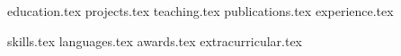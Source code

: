 \documentclass[letterpaper,11pt]{article}
\begin{document}


\vspace{-1cm}
{education.tex}
\vspace{-1.5cm}
{projects.tex}
{teaching.tex}
{publications.tex}
{experience.tex}

\pagebreak

\sidebyside
    {{skills.tex}}
    {{languages.tex}}
{awards.tex}
{extracurricular.tex}
\end{document}
